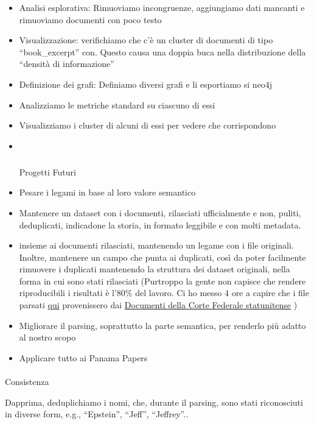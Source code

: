 \documentclass[
  italian,
  a4paper,
]{article}
\makeatletter
\let\oldparagraph\paragraph
\renewcommand{\paragraph}{
    \@ifstar
      \xxxParagraphStar
      \xxxParagraphNoStar
  }
\newcommand{\xxxParagraphStar}[1]{\oldparagraph*{#1}\mbox{}}
\newcommand{\xxxParagraphNoStar}[1]{\oldparagraph{#1}\mbox{}}
\let\oldsubparagraph\subparagraph
\renewcommand{\subparagraph}{
    \@ifstar
      \xxxSubParagraphStar
      \xxxSubParagraphNoStar
  }
\newcommand{\xxxSubParagraphStar}[1]{\oldsubparagraph*{#1}\mbox{}}
\newcommand{\xxxSubParagraphNoStar}[1]{\oldsubparagraph{#1}\mbox{}}
\makeatother
\begin{document}
\begin{itemize}
\item
  Analisi esplorativa: Rimuoviamo incongruenze, aggiungiamo dati
  mancanti e rimuoviamo documenti con poco testo
\item
  Visualizzazione: verifichiamo che c'è un cluster di documenti di tipo
  ``book\_excerpt'' con. Questo causa una doppia buca nella
  distribuzione della ``densità di informazione''
\item
  Definizione dei grafi: Definiamo diversi grafi e li esportiamo si
  neo4j
\item
  Analizziamo le metriche standard su ciascuno di essi
\item
  Visualizziamo i cluster di alcuni di essi per vedere che corrispondono
\item ~
  \subparagraph{Progetti Futuri}\label{progetti-futuri}
\item
  Pesare i legami in base al loro valore semantico
\item
  Mantenere un dataset con i documenti, rilasciati ufficialmente e non,
  puliti, deduplicati, indicadone la storia, in formato leggibile e con
  molti metadata.
\item
  insieme ai documenti rilasciati, mantenendo un legame con i file
  originali. Inoltre, mantenere un campo che punta ai duplicati, così da
  poter facilmente rimuovere i duplicati mantenendo la struttura dei
  dataset originali, nella forma in cui sono stati rilasciati (Purtroppo
  la gente non capisce che rendere riproducibili i risultati è l'80\%
  del lavoro. Ci ho messo 4 ore a capire che i file parsati
  \href{https://github.com/epstein-docs/epstein-docs.github.io}{qui}
  provenissero dai
  \href{https://drive.google.com/drive/folders/1TrGxDGQLDLZu1vvvZDBAh-e7wN3y6Hoz}{Documenti
  della Corte Federale statunitense} )
\item
  Migliorare il parsing, soprattutto la parte semantica, per renderlo
  più adatto al nostro scopo
\item
  Applicare tutto ai Panama Papers
\end{itemize}

\paragraph{Consistenza}\label{consistenza}

Dapprima, deduplichiamo i nomi, che, durante il parsing, sono stati
riconosciuti in diverse form, e.g., ``Epstein'', ``Jeff'', ``Jeffrey''..
\end{document}

